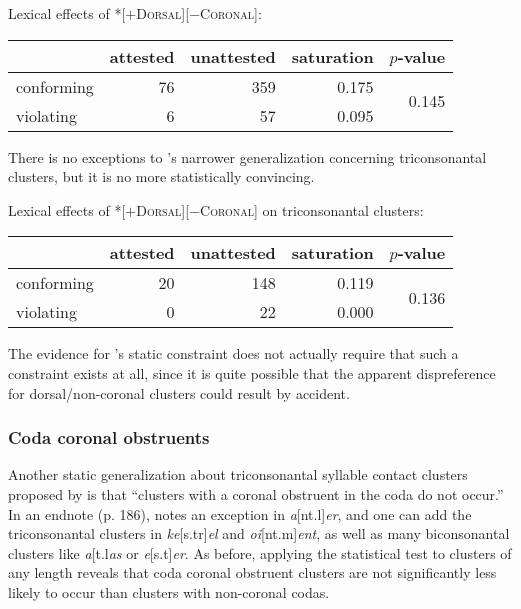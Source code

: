 \ex Lexical effects of \textsc{*[$+$Dorsal][$-$Coronal]}: \vspace{6pt} \\
\begin{tabular}{l r r r r}
\toprule
           & attested & unattested & saturation & $p$-value \\
\midrule
conforming & 76 & 359 & 0.175 & \multirow{2}{*}{0.145} \\
violating  &  6 &  57 & 0.095 \\
\bottomrule
\end{tabular}
\xe

There is no exceptions to \citeauthor{Pierrehumbert1994}'s narrower generalization concerning triconsonantal clusters, but it is no more statistically convincing. 

\ex Lexical effects of \textsc{*[$+$Dorsal][$-$Coronal]} on triconsonantal clusters: \vspace{6pt} \\
\begin{tabular}{l r r r r}
\toprule
           & attested & unattested & saturation & $p$-value \\
\midrule
conforming & 20 & 148 & 0.119 & \multirow{2}{*}{0.136} \\
violating  &  0 &  22 & 0.000 \\
\bottomrule
\end{tabular}
\xe

\noindent
The evidence for \citeauthor{Pierrehumbert1994}'s static constraint does not actually require that such a constraint exists at all, since it is quite possible that the apparent dispreference for dorsal/non-coronal clusters could result by accident.

\subsubsection{Coda coronal obstruents}

Another static generalization about triconsonantal syllable contact clusters proposed by \citet[][175]{Pierrehumbert1994} is that  ``clusters with a coronal obstruent in the coda do not occur.'' In an endnote (p. 186), \citet{Pierrehumbert1994} notes an exception in \emph{a}[nt.l]\emph{er}, and one can add the triconsonantal clusters in \emph{ke}[s.tr]\emph{el} and \emph{oi}[nt.m]\emph{ent}, as well as many biconsonantal clusters like \emph{a}[t.l\emph{as} or \emph{e}[s.t]\emph{er}. As before, applying the statistical test to clusters of any length reveals that coda coronal obstruent clusters are not significantly less likely to occur than clusters with non-coronal codas. 

